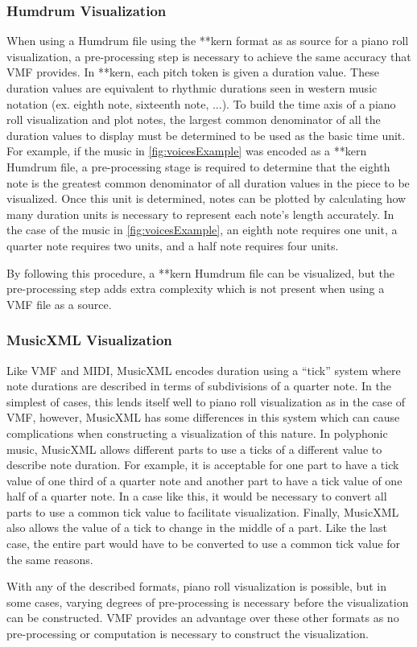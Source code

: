 \subsubsection{Humdrum Visualization}

When using a Humdrum file using the **kern format as as source for a piano roll visualization, a pre-processing step is necessary to achieve the same accuracy that VMF provides. In **kern, each pitch token is given a duration value. These duration values are equivalent to rhythmic durations seen in western music notation (ex. eighth note, sixteenth note, ...). To build the time axis of a piano roll visualization and plot notes, the largest common denominator of all the duration values to display must be determined to be used as the basic time unit. For example, if the music in \ref{fig:voicesExample} was encoded as a **kern Humdrum file, a pre-processing stage is required to determine that the eighth note is the greatest common denominator of all duration values in the piece to be visualized. Once this unit is determined, notes can be plotted by calculating how many duration units is necessary to represent each note's length accurately. In the case of the music in \ref{fig:voicesExample}, an eighth note requires one unit, a quarter note requires two units, and a half note requires four units.

By following this procedure, a **kern Humdrum file can be visualized, but the pre-processing step adds extra complexity which is not present when using a VMF file as a source.

\subsubsection{MusicXML Visualization}

Like VMF and MIDI, MusicXML encodes duration using a ``tick'' system where note durations are described in terms of subdivisions of a quarter note. In the simplest of cases, this lends itself well to piano roll visualization as in the case of VMF, however, MusicXML has some differences in this system which can cause complications when constructing a visualization of this nature. In polyphonic music, MusicXML allows different parts to use a ticks of a different value to describe note duration. For example, it is acceptable for one part to have a tick value of one third of a quarter note and another part to have a tick value of one half of a quarter note. In a case like this, it would be necessary to convert all parts to use a common tick value to facilitate visualization. Finally, MusicXML also allows the value of a tick to change in the middle of a part. Like the last case, the entire part would have to be converted to use a common tick value for the same reasons.

With any of the described formats, piano roll visualization is possible, but in some cases, varying degrees of pre-processing is necessary before the visualization can be constructed. VMF provides an advantage over these other formats as no pre-processing or computation is necessary to construct the visualization.